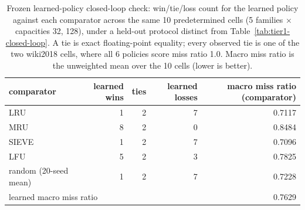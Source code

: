 \begin{table}[H]
  \centering
  \footnotesize
  \caption{Frozen learned-policy closed-loop check: win/tie/loss count for the learned policy against each comparator across the same 10 predetermined cells (5 families $\times$ capacities 32, 128), under a held-out protocol distinct from Table~\ref{tab:tier1-closed-loop}. A tie is exact floating-point equality; every observed tie is one of the two wiki2018 cells, where all 6 policies score miss ratio 1.0. Macro miss ratio is the unweighted mean over the 10 cells (lower is better).}
  \label{tab:learned-closed-loop}
  \begin{tabularx}{\columnwidth}{@{}lrrrr@{}}
    \toprule
    comparator & learned wins & ties & learned losses & macro miss ratio (comparator) \\
    \midrule
    LRU    & 1 & 2 & 7 & 0.7117 \\
    MRU    & 8 & 2 & 0 & 0.8484 \\
    SIEVE  & 1 & 2 & 7 & 0.7096 \\
    LFU    & 5 & 2 & 3 & 0.7825 \\
    random (20-seed mean) & 1 & 2 & 7 & 0.7228 \\
    \midrule
    \multicolumn{4}{l}{learned macro miss ratio} & 0.7629 \\
    \bottomrule
  \end{tabularx}
\end{table}
